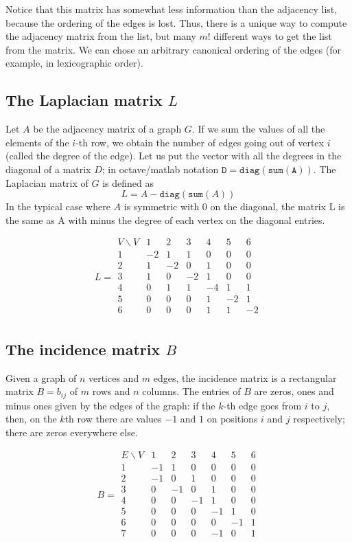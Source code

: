 Notice that this matrix has somewhat less information than the adjacency
list, because the ordering of the edges is lost.  Thus, there is a unique way
to compute the adjacency matrix from the list, but many $m!$ different ways
to get the list from the matrix.  We can chose an arbitrary canonical
ordering of the edges (for example, in lexicographic order).


\subsection{The Laplacian matrix $L$}


Let $A$ be the adjacency matrix of a graph $G$.
If we sum the values of all the elements of the $i$-th row, we obtain the
number of edges going out of vertex $i$ (called the degree of the edge).
Let us put the vector with all the degrees in the diagonal of a matrix $D$; in
octave/matlab notation $\mathtt{D=diag(sum(A))}$.
The Laplacian matrix of $G$ is defined as
\[
L = A - \mathtt{diag}(\mathtt{sum}(A))
\]
In the typical case where $A$ is symmetric with 0 on the diagonal, the matrix
L is the same as A with minus the degree of each vertex on the diagonal
entries.

$$
L =
\begin{array}{l|lllllll}
	V\backslash V
	  & 1 & 2 & 3 & 4 & 5 & 6 \\
	\hline
	1 &-2 & 1 & 1 & 0 & 0 & 0 \\
	2 & 1 &-2 & 0 & 1 & 0 & 0 \\
	3 & 1 & 0 &-2 & 1 & 0 & 0 \\
	4 & 0 & 1 & 1 &-4 & 1 & 1 \\
	5 & 0 & 0 & 0 & 1 &-2 & 1 \\
	6 & 0 & 0 & 0 & 1 & 1 &-2 \\
\end{array}
$$


\subsection{The incidence matrix $B$}


Given a graph of $n$ vertices and $m$ edges,
the incidence matrix is a rectangular matrix $B=b_{ij}$ of $m$ rows and $n$
columns.  The entries of $B$ are zeros, ones and minus ones given by the
edges of the graph: if the $k$-th edge goes from $i$ to $j$, then, on the
$k$th row there are values $-1$ and $1$ on positions $i$ and $j$
respectively; there are zeros everywhere else.

$$
B =
\begin{array}{l|lllllll}
	E\backslash V
	  & 1 & 2 & 3 & 4 & 5 & 6 \\
	\hline
	1 &-1 & 1 & 0 & 0 & 0 & 0 \\
	2 &-1 & 0 & 1 & 0 & 0 & 0 \\
	3 & 0 &-1 & 0 & 1 & 0 & 0 \\
	4 & 0 & 0 &-1 & 1 & 0 & 0 \\
	5 & 0 & 0 & 0 &-1 & 1 & 0 \\
	6 & 0 & 0 & 0 & 0 &-1 & 1 \\
	7 & 0 & 0 & 0 &-1 & 0 & 1 \\
\end{array}
$$




